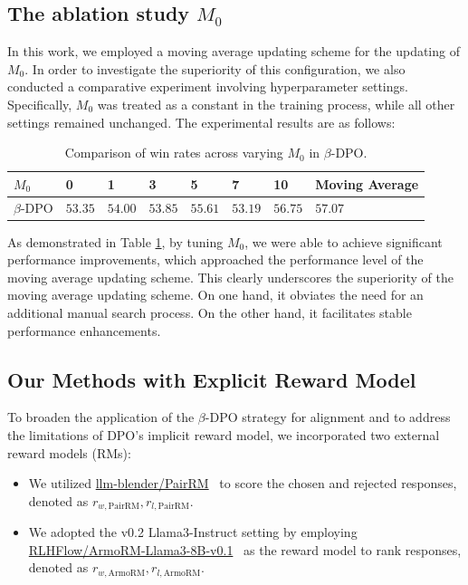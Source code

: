 \subsection{The ablation study \wrt $M_0$}
In this work, we employed a moving average updating scheme \cite{mae} for the updating of $M_0$. In order to investigate the superiority of this configuration, we also conducted a comparative experiment involving hyperparameter settings. Specifically, $M_0$ was treated as a constant in the training process, while all other settings remained unchanged. The experimental results are as follows:
\begin{table}[h]
    \centering
    \caption{
    Comparison of win rates across varying $M_0$ in $\beta$-DPO.
    }
    \begin{tabular}{l|l|l|l|l|l|l|l}
        \toprule
        \textbf{$M_0$} & 0 & 1 & 3 & 5& 7& 10 & Moving Average\\
        \midrule
        $\beta$-DPO & $53.35$ & $54.00$ & $53.85$ & $55.61$  &$53.19$ & $56.75$& $57.07$ \\
        \bottomrule
    \end{tabular}
    \label{tab:constant_m0}
\end{table}

As demonstrated in Table \ref{tab:constant_m0}, by tuning $M_0$, we were able to achieve significant performance improvements, which approached the performance level of the moving average updating scheme. This clearly underscores the superiority of the moving average updating scheme. On one hand, it obviates the need for an additional manual search process. On the other hand, it facilitates stable performance enhancements.

\subsection{Our Methods with Explicit Reward Model}
\label{sec:appendix_explicit_rm}
To broaden the application of the $\beta$-DPO strategy for alignment and to address the limitations of DPO's implicit reward model, we incorporated two external reward models (RMs):

\begin{itemize}[leftmargin=*]
    \item We utilized \href{https://huggingface.co/llm-blender/PairRM}{llm-blender/PairRM}~\cite{Jiang2023LLMBlenderEL} to score the chosen and rejected responses, denoted as \(r_{w,\text{PairRM}}, r_{l,\text{PairRM}}\).
    \item We adopted the v0.2 Llama3-Instruct setting \cite{SimPO2024} by employing \href{https://huggingface.co/RLHFlow/ArmoRM-Llama3-8B-v0.1}{{RLHFlow/ArmoRM-Llama3-8B-v0.1}}~\cite{ArmoRM} as the reward model to rank responses, denoted as \(r_{w,\text{ArmoRM}}, r_{l,\text{ArmoRM}}\).
\end{itemize}

